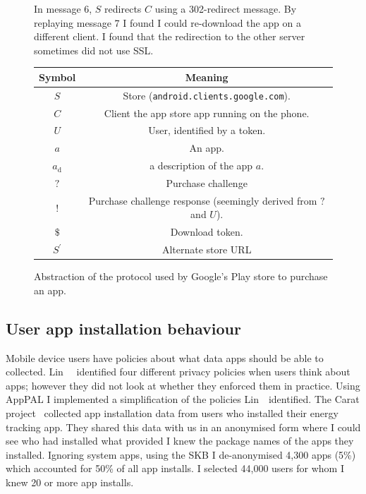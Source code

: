 \documentclass[a4paper]{scrartcl}
\begin{document}
\begin{figure}[!h]
\begin{minipage}{0.48\linewidth}
    {\footnotesize In message 6, $S$ redirects $C$ using a 302-redirect message.
      By replaying message 7 I found I could re-download the app on a different client.
      I found that the redirection to the other server sometimes did not use SSL.}
  \end{minipage}
  \begin{minipage}{0.48\linewidth}
    \begin{tabulary}{\linewidth}{cC}
      \toprule
      Symbol         & Meaning                                                           \\
      \midrule
      $S$            & Store (\texttt{android.clients.google.com}).                      \\
      $C$            & Client the app store app running on the phone.                    \\
      $U$            & User, identified by a token.                                      \\
      $a$            & An app.                                                           \\
      $a_{\text{d}}$ & a description of the app $a$.                                     \\
      $?$            & Purchase challenge                                                \\
      $!$            & Purchase challenge response (seemingly derived from $?$ and $U$). \\
      $\$$           & Download token.                                                   \\
      $S^\prime$     & Alternate store URL                                               \\
      \bottomrule
    \end{tabulary}
  \end{minipage}
  \caption{Abstraction of the protocol used by Google's Play store to purchase an app.}
  \label{fig:protocol}
\end{figure}

\subsection{User app installation behaviour}

Mobile device users have policies about what data apps should be able to collected.
Lin~\etal~\citep{Sadeh:2014vq} identified four different privacy policies when users think about apps; however they did not look at whether they enforced them in practice.
Using AppPAL I implemented a simplification of the policies Lin~\etal~identified.
The Carat project~\citep{Oliner:2013ht} collected app installation data from users who installed their energy tracking app.
They shared this data with us in an anonymised form where I could see who had installed what provided I knew the package names of the apps they installed.
Ignoring system apps, using the \ac{SKB} I de-anonymised 4,300 apps (5\%) which accounted for 50\% of all app installs.
I selected 44,000 users for whom I knew 20 or more app installs.
\end{document}

